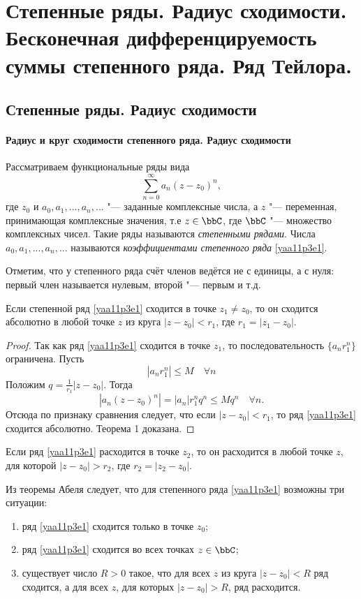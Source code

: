 \chapter{Степенные ряды. Радиус сходимости. Бесконечная дифференцируемость суммы степенного ряда. Ряд Тейлора.}
\section{Степенные ряды. Радиус сходимости}
\subsubsection{Радиус и круг сходимости степенного ряда. Радиус сходимости}
Рассматриваем функциональные ряды вида
\begin{equation}\label{yaa11p3e1}
\sum\limits_{n=0}^{\infty} a_n(z-z_0)^n,
\end{equation}
где $z_0$ и $a_0,a_1,...,a_n,...$ "--- заданные комплексные числа, а $z$ "--- переменная, принимающая комплексные значения, т.е $z\in\bbC$, где $\bbC$ "--- множество комплексных чисел. Такие ряды называются \textit{степенными рядами}. Числа $a_0,a_1,...,a_n,...$ называются \textit{коэффициентами степенного ряда} \eqref{yaa11p3e1}.

Отметим, что у степенного ряда счёт членов ведётся не с единицы, а с нуля: первый член называется нулевым, второй "--- первым и т.д.

\begin{thm}
Если степенной ряд \eqref{yaa11p3e1} сходится в точке $z_1\ne z_0$, то он сходится абсолютно в любой точке $z$ из круга $|z-z_0|<r_1$, где $r_1=|z_1-z_0|$.
\end{thm}

\begin{proof}
Так как ряд \eqref{yaa11p3e1} сходится в точке $z_1$, то последовательность $\{a_n r_1^n\}$ ограничена. Пусть
$$
|a_nr_1^n|\le M \quad \forall n
$$
Положим $q=\frac{1}{r_1}|z-z_0|$. Тогда
$$
|a_n(z-z_0)^n|=|a_n|r_1^nq^n\le Mq^n\quad \forall n.
$$
Отсюда по признаку сравнения следует, что если $|z-z_0|<r_1$, то ряд \eqref{yaa11p3e1} сходится абсолютно. Теорема 1 доказана.
\end{proof}

\begin{cons}
Если ряд \eqref{yaa11p3e1} расходится в точке $z_2$, то он расходится в любой точке $z$, для которой $|z-z_0|>r_2$, где $r_2=|z_2-z_0|$.
\end{cons}

Из теоремы Абеля следует, что для степенного ряда \eqref{yaa11p3e1} возможны три ситуации:
\begin{enumerate}
\item ряд \eqref{yaa11p3e1} сходится только в точке $z_0$;
\item ряд \eqref{yaa11p3e1} сходится во всех точках $z\in\bbC$;
\item существует число $R>0$ такое, что для всех $z$ из круга $|z-z_0|<R$ ряд сходится, а для всех $z$, для которых $|z-z_0|>R$, ряд расходится.
\end{enumerate}

